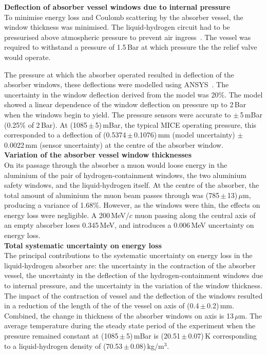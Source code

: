 \noindent\textbf{Deflection of absorber vessel windows due to internal
  pressure} \\
\noindent
To minimise energy loss and Coulomb scattering by the absorber vessel,
the window thickness was minimised.
The liquid-hydrogen circuit had to be pressurised
above atmospheric pressure to prevent air
ingress~\cite{1748-0221-13-09-T09008}\cite{Ishimoto}. 
The vessel was required to withstand a pressure of 1.5\,Bar at which
pressure the the relief valve would operate.

The pressure at which the absorber operated resulted in deflection of
the absorber windows, these deflections were modelled using
ANSYS~\cite{NOTE155}.
The uncertainty in the window deflection derived from the model was
20\%.
The model showed a linear dependence of the window deflection on
pressure up to 2\,Bar when the windows begin to yield.
The pressure sensors were accurate to $\mathrm{\pm}$\,5\,mBar
(0.25\% of 2\,Bar).
At (1085\,$\mathrm{\pm}$\,5)\,mBar, the typical MICE operating
pressure, this corresponded to a deflection of
(0.5374\,$\mathrm{\pm}$\,0.1076)\,mm (model uncertainty)
$\mathrm{\pm}$\,0.0022\,mm (sensor uncertainty) at the centre of the
absorber window. \\

\noindent\textbf{Variation of the absorber vessel window thicknesses} \\
\noindent
On its passage through the absorber a muon would loose energy in the
aluminium of the pair of hydrogen-containment windows, the two
aluminium safety windows, and the liquid-hydrogen itself.
At the centre of the absorber, the total amount of aluminium the muon
beam passes through was (785\,$\mathrm{\pm}$\,13)\,$\mu$m, producing a variance
of 1.68\%.
However, as the windows were thin, the effects on energy loss were
negligible.
A 200\,MeV/$c$ muon passing along the central axis of an empty
absorber loses 0.345\,MeV, and introduces a 0.006\,MeV uncertainty
on energy loss.  \\

\noindent\textbf{Total systematic uncertainty on energy loss} \\
\noindent
The principal contributions to the systematic uncertainty on energy
loss in the liquid-hydrogen absorber are: the uncertainty in the
contraction of the absorber vessel, the uncertainty in the deflection
of the hydrogen-containment windows due to internal pressure, and the
uncertainty in the variation of the window thickness.
The impact of the contraction of vessel and the deflection of the
windows resulted in a reduction of the length of the of the vessel on
axis of (0.4\,$\mathrm{\pm}$\,0.2)\,mm.
Combined, the change in thickness of the absorber windows on axis is 13\,$\mu$m.
The average temperature during the steady state period of the
experiment when the pressure remained constant at
(1085\,$\mathrm{\pm}$\,5)\,mBar is (20.51\,$\mathrm{\pm}$\,0.07)\,K 
corresponding to a liquid-hydrogen density of (70.53\,$\mathrm{\pm}$\,0.08)\,kg/m$^{3}$.

